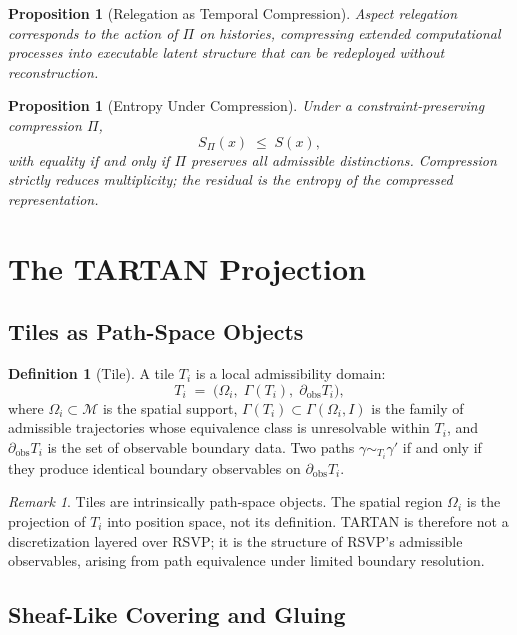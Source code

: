 \documentclass[11pt]{article}
\theoremstyle{plain}
\newtheorem{proposition}[theorem]{Proposition}
\theoremstyle{definition}
\newtheorem{definition}[theorem]{Definition}
\theoremstyle{remark}
\newtheorem{remark}[theorem]{Remark}
\newcommand{\Ss}{S}
\newcommand{\M}{\mathcal{M}}
\begin{document}
\begin{proposition}[Relegation as Temporal Compression]
Aspect relegation corresponds to the action of $\Pi$ on histories,
compressing extended computational processes into executable latent
structure that can be redeployed without reconstruction.
\end{proposition}

\begin{proposition}[Entropy Under Compression]
Under a constraint-preserving compression $\Pi$,
\[
  \Ss_\Pi(x) \;\leq\; \Ss(x),
\]
with equality if and only if $\Pi$ preserves all admissible distinctions.
Compression strictly reduces multiplicity; the residual is the entropy
of the compressed representation.
\end{proposition}

\section{The TARTAN Projection}

\subsection{Tiles as Path-Space Objects}

\begin{definition}[Tile]
A tile $T_i$ is a local admissibility domain:
\[
  T_i \;=\; \bigl(\Omega_i,\;\Gamma(T_i),\;\partial_{\mathrm{obs}} T_i\bigr),
\]
where $\Omega_i \subset \M$ is the spatial support, $\Gamma(T_i) \subset
\Gamma(\Omega_i, I)$ is the family of admissible trajectories whose
equivalence class is unresolvable within $T_i$, and
$\partial_{\mathrm{obs}} T_i$ is the set of observable boundary data.
Two paths $\gamma \sim_{T_i} \gamma'$ if and only if they produce identical
boundary observables on $\partial_{\mathrm{obs}} T_i$.
\end{definition}

\begin{remark}
Tiles are intrinsically path-space objects. The spatial region $\Omega_i$
is the projection of $T_i$ into position space, not its definition. TARTAN
is therefore not a discretization layered over RSVP; it is the structure
of RSVP's admissible observables, arising from path equivalence under
limited boundary resolution.
\end{remark}

\subsection{Sheaf-Like Covering and Gluing}
\end{document}
